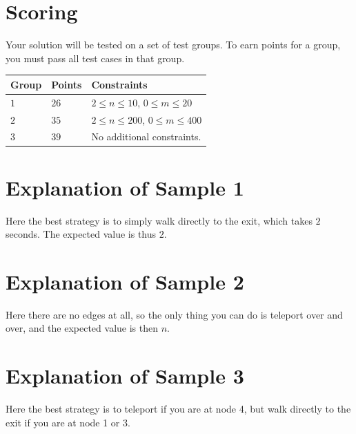\section*{Scoring}
Your solution will be tested on a set of test groups.
To earn points for a group, you must pass all test cases in that group.

\noindent
\begin{tabular}{| l | l | p{12cm} |}
  \hline
  Group & Points & Constraints \\ \hline
    $1$   & $26$     & $2 \le n \le 10$, $0 \le m \le 20$ \\ \hline
    $2$   & $35$     & $2 \le n \le 200$, $0 \le m \le 400$ \\ \hline
    $3$   & $39$     & No additional constraints. \\ \hline
\end{tabular}

\section*{Explanation of Sample 1}
Here the best strategy is to simply walk directly to the exit, which takes $2$ seconds. The expected value is thus $2$.

\section*{Explanation of Sample 2}
Here there are no edges at all, so the only thing you can do is teleport over and over, and the expected value is then $n$.

\section*{Explanation of Sample 3}
Here the best strategy is to teleport if you are at node 4, but walk directly to the exit if you are at node 1 or 3.
